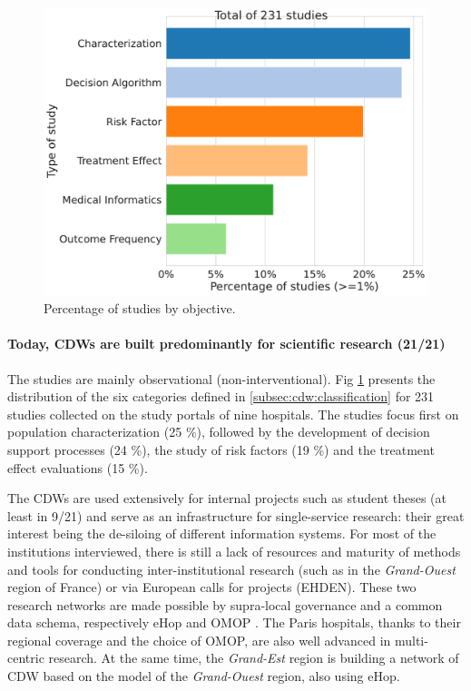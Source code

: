 \documentclass[french,12pt,twoside,a4paper]{book}
\begin{document}
\begin{minipage}{0.5\textwidth}
  \begin{figure}[H]
    \centering
    \includegraphics[width=\linewidth]{img/chapter_2/Fig4.pdf}
    \caption{Percentage of studies by objective.}
    \label{results:usage:image:study_objective}
  \end{figure}
\end{minipage}

\paragraph{Today, CDWs are built predominantly for scientific research (21/21)}

The studies are mainly observational (non-interventional). Fig
\ref{results:usage:image:study_objective} presents the distribution of the six
categories defined in \ref{subsec:cdw:classification} for 231 studies collected
on the study portals of nine hospitals. The studies focus first on population
characterization (25 \%), followed by the development of decision support
processes (24 \%), the study of risk factors (19 \%) and the treatment effect
evaluations (15 \%).


The CDWs are used extensively for internal projects such as student theses (at
least in 9/21) and serve as an infrastructure for single-service research: their
great interest being the de-siloing of different information systems. For most
of the institutions interviewed, there is still a lack of resources and maturity
of methods and tools for conducting inter-institutional research (such as in the
\textit{Grand-Ouest} region of France) or via European calls for projects
(EHDEN). These two research networks are made possible by supra-local governance
and a common data schema, respectively eHop \citep{madec_ehop_2019} and OMOP
\citep{hripcsak_observational_2015}. The Paris hospitals, thanks to their
regional coverage and the choice of OMOP, are also well advanced in multi-centric
research. At the same time, the \textit{Grand-Est} region is building a network
of CDW based on the model of the \textit{Grand-Ouest} region, also using eHop.
\end{document}
